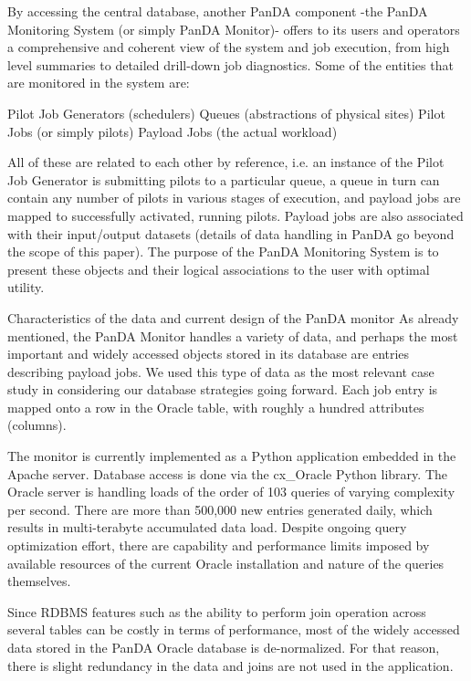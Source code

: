 By accessing the central database, another PanDA component -the PanDA Monitoring System (or simply PanDA Monitor)- offers to its users and operators a comprehensive and coherent view of the system and job execution, from high level summaries to detailed drill-down job diagnostics. Some of the entities that are monitored in the system are:

Pilot Job Generators (schedulers)
Queues (abstractions of physical sites)
Pilot Jobs (or simply pilots)
Payload Jobs (the actual workload)

All of these are related to each other by reference, i.e. an instance of the Pilot Job Generator is submitting pilots to a particular queue, a queue in turn can contain any number of pilots in various stages of execution, and payload jobs are mapped to successfully activated, running pilots. Payload jobs are also associated with their input/output datasets (details of data handling in PanDA go beyond the scope of this paper). The purpose of the PanDA Monitoring System is to present these objects and their logical associations to the user with optimal utility.

Characteristics of the data and current design of the PanDA monitor
As already mentioned, the PanDA Monitor handles a variety of data, and perhaps the most important and widely accessed objects stored in its database are entries describing payload jobs. We used this type of data as the most relevant case study in considering our database strategies going forward. Each job entry is mapped onto a row in the Oracle table, with roughly a hundred attributes (columns).

The monitor is currently implemented as a Python application embedded in the Apache server. Database access is done via the cx\_Oracle Python library. The Oracle server is handling loads of the order of 103 queries of varying complexity per second. There are more than 500,000 new entries generated daily, which results in multi-terabyte accumulated data load. Despite ongoing query optimization effort, there are capability and performance limits imposed by available resources of the current Oracle installation and nature of the queries themselves.

Since RDBMS features such as the ability to perform join operation across several tables can be costly in terms of performance, most of the widely accessed data stored in the PanDA Oracle database is de-normalized. For that reason, there is slight redundancy in the data and joins are not used in the application.

